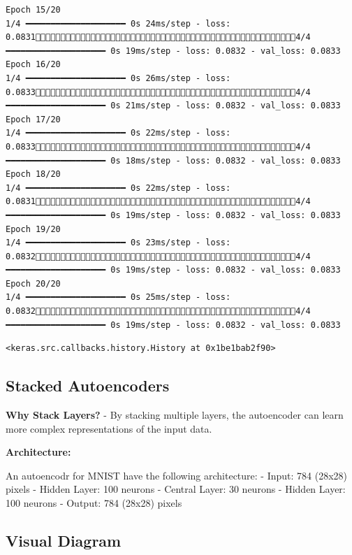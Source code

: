 \documentclass[
  letterpaper,
  DIV=11,
  numbers=noendperiod]{scrreprt}
\begin{document}
\begin{verbatim}
Epoch 15/20
1/4 ━━━━━━━━━━━━━━━━━━━━ 0s 24ms/step - loss: 0.08314/4 ━━━━━━━━━━━━━━━━━━━━ 0s 19ms/step - loss: 0.0832 - val_loss: 0.0833
Epoch 16/20
1/4 ━━━━━━━━━━━━━━━━━━━━ 0s 26ms/step - loss: 0.08334/4 ━━━━━━━━━━━━━━━━━━━━ 0s 21ms/step - loss: 0.0832 - val_loss: 0.0833
Epoch 17/20
1/4 ━━━━━━━━━━━━━━━━━━━━ 0s 22ms/step - loss: 0.08334/4 ━━━━━━━━━━━━━━━━━━━━ 0s 18ms/step - loss: 0.0832 - val_loss: 0.0833
Epoch 18/20
1/4 ━━━━━━━━━━━━━━━━━━━━ 0s 22ms/step - loss: 0.08314/4 ━━━━━━━━━━━━━━━━━━━━ 0s 19ms/step - loss: 0.0832 - val_loss: 0.0833
Epoch 19/20
1/4 ━━━━━━━━━━━━━━━━━━━━ 0s 23ms/step - loss: 0.08324/4 ━━━━━━━━━━━━━━━━━━━━ 0s 19ms/step - loss: 0.0832 - val_loss: 0.0833
Epoch 20/20
1/4 ━━━━━━━━━━━━━━━━━━━━ 0s 25ms/step - loss: 0.08324/4 ━━━━━━━━━━━━━━━━━━━━ 0s 19ms/step - loss: 0.0832 - val_loss: 0.0833
\end{verbatim}

\begin{verbatim}
<keras.src.callbacks.history.History at 0x1be1bab2f90>
\end{verbatim}

\subsection{Stacked Autoencoders}\label{stacked-autoencoders}

\textbf{Why Stack Layers?} - By stacking multiple layers, the
autoencoder can learn more complex representations of the input data.

\textbf{Architecture:}

An autoencodr for MNIST have the following architecture: - Input: 784
(28x28) pixels - Hidden Layer: 100 neurons - Central Layer: 30 neurons -
Hidden Layer: 100 neurons - Output: 784 (28x28) pixels

\subsection{Visual Diagram}\label{visual-diagram-4}
\end{document}

